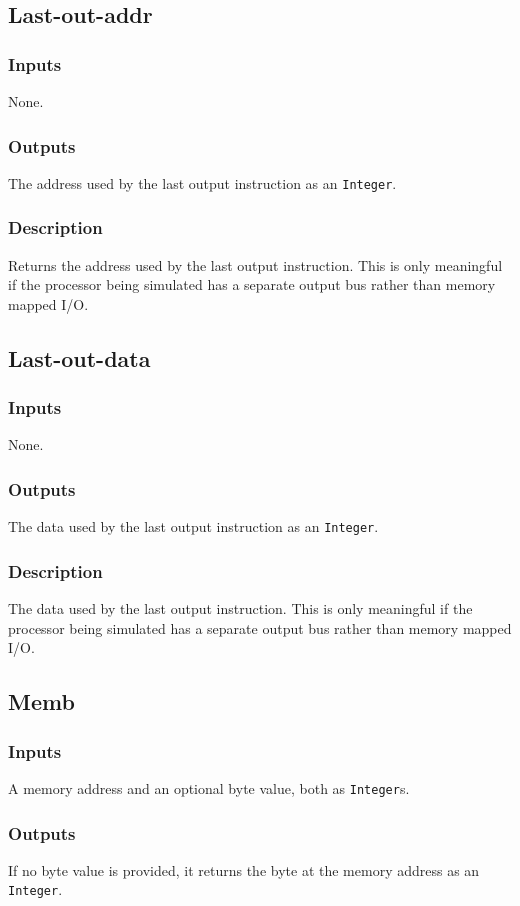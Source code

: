 \documentclass[10pt, openany]{book}
\newcommand{\datatype}[1]{\texttt{#1}}
\begin{document}
\subsection{Last-out-addr}
\subsubsection{Inputs}
None.
\subsubsection{Outputs}
The address used by the last output instruction as an \datatype{Integer}.
\subsubsection{Description}
Returns the address used by the last output instruction.
This is only meaningful if the processor being simulated has a separate output bus rather than memory mapped I/O.

\subsection{Last-out-data}
\subsubsection{Inputs}
None.
\subsubsection{Outputs}
The data used by the last output instruction as an \datatype{Integer}.
\subsubsection{Description}
The data used by the last output instruction.
This is only meaningful if the processor being simulated has a separate output bus rather than memory mapped I/O.

\subsection{Memb}
\subsubsection{Inputs}
A memory address and an optional byte value, both as \datatype{Integer}s.
\subsubsection{Outputs}
If no byte value is provided, it returns the byte at the memory address as an \datatype{Integer}.
\end{document}
